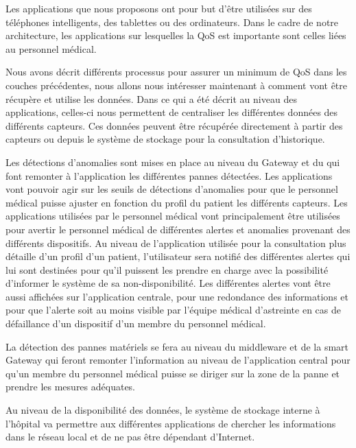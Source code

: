 Les applications que nous proposons ont pour but d’être utilisées sur des téléphones intelligents, des tablettes ou des ordinateurs. Dans le cadre de notre architecture, les applications sur lesquelles la QoS est importante sont celles liées au personnel médical.

Nous avons décrit différents processus pour assurer un minimum de QoS dans les couches précédentes, nous allons nous intéresser maintenant à comment vont être récupère et utilise les données. Dans ce qui a été décrit au niveau des applications, celles-ci nous permettent de centraliser les différentes données des différents capteurs. Ces données peuvent être récupérée directement à partir des capteurs ou depuis le système de stockage pour la consultation d’historique.

Les détections d’anomalies sont mises en place au niveau du Gateway et du qui font remonter à l’application les différentes pannes détectées. Les applications vont pouvoir agir sur les seuils de détections d’anomalies pour que le personnel médical puisse ajuster en fonction du profil du patient les différents capteurs. Les applications utilisées par le personnel médical vont principalement être utilisées pour avertir le personnel médical de différentes alertes et anomalies provenant des différents dispositifs. Au niveau de l’application utilisée pour la consultation plus détaille d’un profil d’un patient, l’utilisateur sera notifié des différentes alertes qui lui sont destinées pour qu’il puissent les prendre en charge avec la possibilité d’informer le système de sa non-disponibilité. Les différentes alertes vont être aussi affichées sur l’application centrale, pour une redondance des informations et pour que l’alerte soit au moins visible par l’équipe médical d’astreinte en cas de défaillance d’un dispositif d’un membre du personnel médical.

La détection des pannes matériels se fera au niveau du middleware et de la smart Gateway qui feront remonter l’information au niveau de l’application central pour qu’un membre du personnel médical puisse se diriger sur la zone de la panne et prendre les mesures adéquates.

Au niveau de la disponibilité des données, le système de stockage interne à l’hôpital va permettre aux différentes applications de chercher les informations dans le réseau local et de ne pas être dépendant d’Internet.             